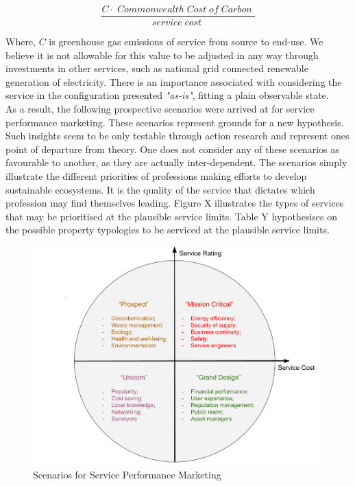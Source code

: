\documentclass[11pt, oneside]{article}   	%
\begin{document}
\begin{equation}
	\frac{C  \cdot \;Commonwealth\; Cost\; of\; Carbon\;}{service\; cost\;}
\end{equation}

Where, $C$ is greenhouse gas emissions of service from source to end-use.
We believe it is not allowable for this value to be adjusted in any way through investments in other services, such as national grid connected renewable generation of electricity.
There is an importance associated with considering the service in the configuration presented \emph{"as-is"}, fitting a plain observable state.\\

As a result, the following prospective scenarios were arrived at for service performance marketing.
These scenarios represent grounds for a new hypothesis.
Such insights seem to be only testable through action research and represent ones point of departure from theory.
One does not consider any of these scenarios as favourable to another, as they are actually inter-dependent.
The scenarios simply illustrate the different priorities of professions making efforts to develop sustainable ecosystems.
It is the quality of the service that dictates which profession may find themselves leading.
Figure X illustrates the types of services that may be prioritised at the plausible service limits.
Table Y hypothesises on the possible property typologies to be serviced at the plausible service limits.\\

\begin{figure}[H]
\centering
\includegraphics[width=1\textwidth]{scenarios}
\caption{Scenarios for Service Performance Marketing}
\label{Scenarios}
\end{figure}
\end{document}

